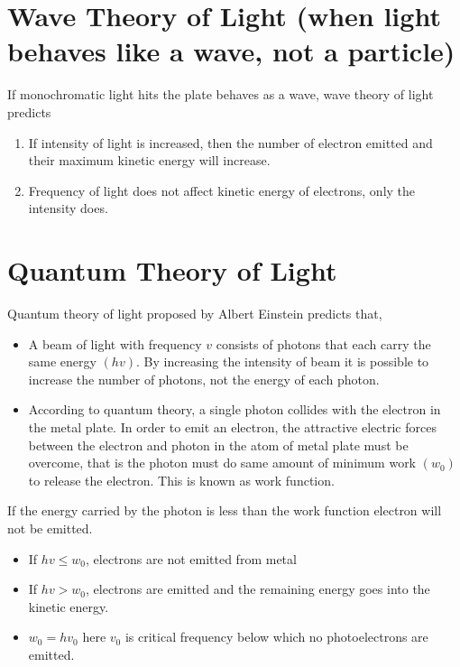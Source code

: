 \documentclass[../main.tex]{subfiles}
\begin{document}
    \section{Wave Theory of Light (when light behaves like a wave, not a particle)}
    If monochromatic light hits the plate behaves as a wave, wave theory of light predicts
    \begin{enumerate}
        \item If intensity of light is increased, then the number of electron emitted and their maximum kinetic energy will increase.
        \item Frequency of light does not affect kinetic energy of electrons, only the intensity does.
    \end{enumerate}
    \section{Quantum Theory of Light}
    Quantum theory of light proposed by Albert Einstein predicts that,
    \begin{itemize}
        \item A beam of light with frequency $ v $ consists of photons that each carry the same energy $ (hv) $. By increasing the intensity of beam it is possible to increase the number of photons, not the energy of each photon.
        \item According to quantum theory, a single photon collides with the electron in the metal plate. In order to emit an electron, the attractive electric forces between the electron and photon in the atom of metal plate must be overcome, that is the photon must do same amount of minimum work $ (w_0) $ to release the electron. This is known as work function.
    \end{itemize}
    If the energy carried by the photon is less than the work function electron will not be emitted.
    \begin{itemize}
        \item If $ hv\leq w_0 $, electrons are not emitted from metal
        \item If $ hv> w_0 $,  electrons are emitted and the remaining energy goes into the kinetic energy.
        \item $ w_0=hv_0 $ here $ v_0 $ is critical frequency below which no photoelectrons are emitted. 
    \end{itemize}
\end{document}
